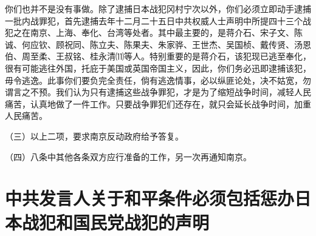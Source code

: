 \documentclass[UTF-8, a5paper, 12pt]{ctexart}
\begin{document}
你们也并不是没有事做。除了逮捕日本战犯冈村宁次以外，你们必须立即动手逮捕一批内战罪犯，首先逮捕去年十二月二十五日中共权威人士声明中所提四十三个战犯之在南京、上海、奉化、台湾等处者。其中最主要的，是蒋介石、宋子文、陈诚、何应钦、顾祝同、陈立夫、陈果夫、朱家骅、王世杰、吴国桢、戴传贤、汤恩伯、周至柔、王叔铭、桂永清⑾等人。特别重要的是蒋介石，该犯现已逃至奉化，很有可能逃往外国，托庇于美国或英国帝国主义，因此，你们务必迅即逮捕该犯，毋令逃逸。此事你们要负完全责任，倘有逃逸情事，必以纵匪论处，决不姑宽，勿谓言之不预。我们认为只有逮捕这些战争罪犯，才是为了缩短战争时间，减轻人民痛苦，认真地做了一件工作。只要战争罪犯们还存在，就只会延长战争时间，加重人民痛苦。

（三）以上二项，要求南京反动政府给予答复。

（四）八条中其他各条双方应行准备的工作，另一次再通知南京。
\section{中共发言人关于和平条件必须包括惩办日本战犯和国民党战犯的声明
}
\end{document}

